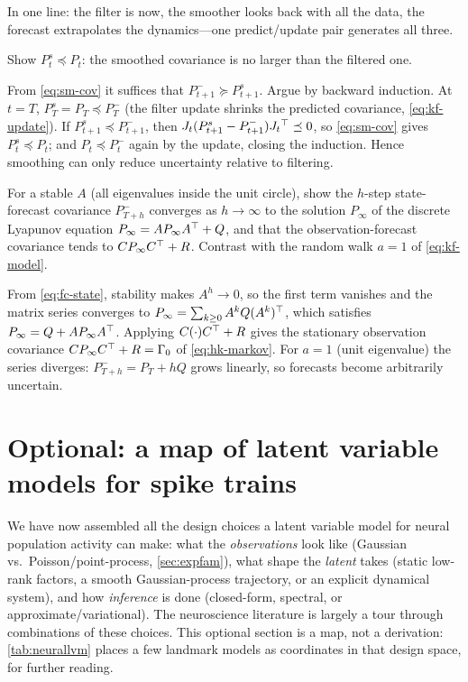 \documentclass[11pt]{article}
\theoremstyle{plain}
\theoremstyle{definition}
\theoremstyle{remark}
\theoremstyle{definition}
\begin{document}
\medskip
In one line: the filter is now, the smoother looks back with all the data, the
forecast extrapolates the dynamics---one predict/update pair generates all three.

\begin{exercise}
Show $P_t^s \preceq P_t$: the smoothed covariance is no larger than the filtered
one.
\end{exercise}
\begin{solution}
From \eqref{eq:sm-cov} it suffices that $P_{t+1}^- \succeq P_{t+1}^s$. Argue by
backward induction. At $t = T$, $P_T^s = P_T \preceq P_T^-$ (the filter update
shrinks the predicted covariance, \eqref{eq:kf-update}). If $P_{t+1}^s \preceq
P_{t+1}^-$, then $J_t(P_{t+1}^s - P_{t+1}^-)J_t{^\top} \preceq 0$, so
\eqref{eq:sm-cov} gives $P_t^s \preceq P_t$; and $P_t \preceq P_t^-$ again by the
update, closing the induction. Hence smoothing can only reduce uncertainty
relative to filtering.
\end{solution}

\begin{exercise}
For a stable $A$ (all eigenvalues inside the unit circle), show the $h$-step
state-forecast covariance $P_{T+h}^-$ converges as $h \to \infty$ to the solution
$P_\infty$ of the discrete Lyapunov equation $P_\infty = A P_\infty A{^\top} + Q$, and
that the observation-forecast covariance tends to $C P_\infty C{^\top} + R$. Contrast
with the random walk $a = 1$ of \eqref{eq:kf-model}.
\end{exercise}
\begin{solution}
From \eqref{eq:fc-state}, stability makes $A^h \to 0$, so the first term vanishes
and the matrix series converges to $P_\infty = \sum_{k\geq 0} A^k Q (A^k){^\top}$,
which satisfies $P_\infty = Q + A P_\infty A{^\top}$. Applying $C(\cdot)C{^\top} + R$
gives the stationary observation covariance $C P_\infty C{^\top} + R = \Gamma_0$ of
\eqref{eq:hk-markov}. For $a = 1$ (unit eigenvalue) the series diverges:
$P_{T+h}^- = P_T + hQ$ grows linearly, so forecasts become arbitrarily uncertain.
\end{solution}

\section{Optional: a map of latent variable models for spike trains}\label{sec:neurallvm}

We have now assembled all the design choices a latent variable model for neural
population activity can make: what the \emph{observations} look like (Gaussian
vs.\ Poisson/point-process, \cref{sec:expfam}), what shape the \emph{latent}
takes (static low-rank factors, a smooth Gaussian-process trajectory, or an
explicit dynamical system), and how \emph{inference} is done (closed-form,
spectral, or approximate/variational). The neuroscience literature is largely a
tour through combinations of these choices. This optional section is a map, not a
derivation: \cref{tab:neurallvm} places a few landmark models as coordinates in
that design space, for further reading.
\end{document}
